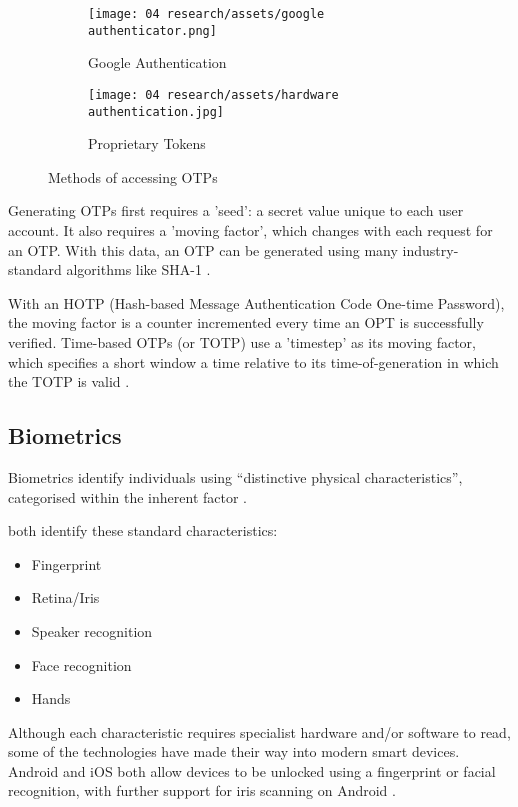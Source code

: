 \begin{figure}[H]
  \centering
  \begin{subfigure}{0.49\linewidth}
    \centering
    \texttt{[image: 04
      research/assets/google authenticator.png]}
    \caption{Google Authentication}
  \end{subfigure}
  \begin{subfigure}{0.49\linewidth}
    \centering
    \texttt{[image: 04
      research/assets/hardware authentication.jpg]}
    \caption{Proprietary
      Tokens}\parencite{hardwareAuthSecurityKeys}
  \end{subfigure}

  \caption{Methods of accessing OTPs}
\end{figure}

Generating OTPs first requires a 'seed': a secret value
unique to each user account.
It also requires a 'moving factor', which changes with each
request for an OTP.
With this data, an OTP can be generated using many
industry-standard algorithms like SHA-1
\parencite{whatIsOtp}.

With an HOTP (Hash-based Message Authentication Code
One-time Password), the moving factor is a counter
incremented every time an OPT is successfully verified.
Time-based OTPs (or TOTP) use a 'timestep' as its moving
factor, which specifies a short window a time relative to
its time-of-generation in which the TOTP is valid
\parencite{whatIsOtp}.

\subsection{Biometrics}

Biometrics identify individuals using \enquote{distinctive
  physical characteristics}, categorised within the inherent
factor \parencite{surveyOnAuthFactors}.

\cite{evalOfAuthMethods,
  surveyOnAuthFactors} both identify these
standard characteristics:

\begin{itemize}
  \item Fingerprint
  \item Retina/Iris
  \item Speaker recognition
  \item Face recognition
  \item Hands
\end{itemize}

Although each characteristic requires specialist hardware
and/or software to read, some of the technologies have made
their way into modern smart devices.
Android and iOS both allow devices to be unlocked using a
fingerprint or facial recognition, with further support for
iris scanning on Android \parencite{androidBiometrics,
  touchId, faceId}.